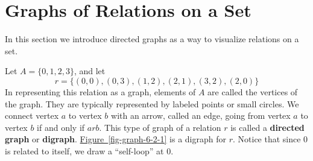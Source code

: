 \documentclass[10pt,]{book}
\newcommand{\terminology}[1]{\textbf{#1}}
\theoremstyle{plain}
\theoremstyle{definition}
\theoremstyle{definition}
\theoremstyle{definition}
\theoremstyle{definition}
\begin{document}
\section[Graphs of Relations on a Set]{Graphs of Relations on a Set}\label{s-graphs-of-relations-on-a-set}
In this section we introduce directed graphs as a way to visualize relations on a set. %
\par
Let \(A = \{0, 1,2,3\}\), and let  \[r = \{(0, 0), (0, 3), (1, 2), (2, 1), (3, 2), (2, 0)\}\]
In representing this relation as a graph, elements of \(A\) are called the vertices of the graph. They are typically represented by labeled points or small circles. We connect vertex \(a\) to vertex \(b\) with an arrow, called an edge, going from vertex \(a\) to vertex \(b\) if and only if \(a r b\).  This type of graph of a relation \(r\) is called a \terminology{directed graph} or \terminology{digraph}. \hyperref[fig-graph-6-2-1]{Figure~\ref{fig-graph-6-2-1}} is a digraph for \(r\). Notice that since 0 is related to itself, we draw a ``self-loop'' at 0.%
\leavevmode%
\end{document}
